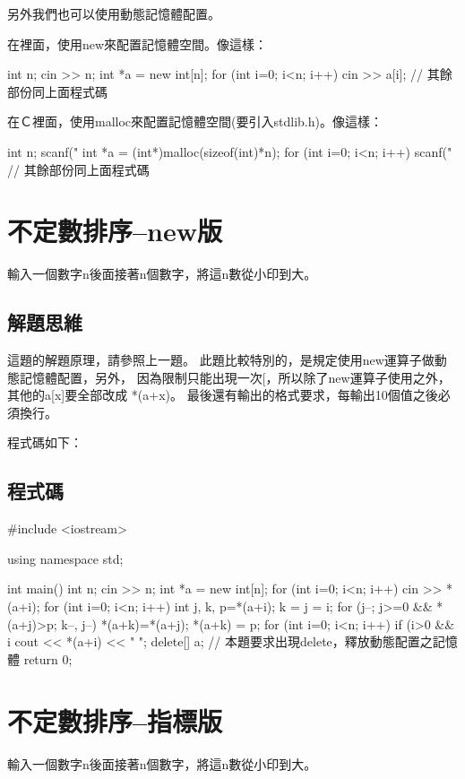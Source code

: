 另外我們也可以使用動態記憶體配置。

在\cc{}裡面，使用new來配置記憶體空間。像這樣：
\begin{inside}
	int n;  cin >> n;
	int *a = new int[n];
	for (int i=0; i<n; i++) cin >> a[i];
	// 其餘部份同上面程式碼
\end{inside}

在Ｃ裡面，使用malloc來配置記憶體空間(要引入stdlib.h)。像這樣：
\begin{inside}
	int n;  scanf("%
	int *a = (int*)malloc(sizeof(int)*n);
	for (int i=0; i<n; i++) scanf("%
	// 其餘部份同上面程式碼
\end{inside}


\section{不定數排序--new版}
輸入一個數字n後面接著n個數字，將這n數從小印到大。

\subsection{解題思維}
這題的解題原理，請參照上一題。
此題比較特別的，是規定使用new運算子做動態記憶體配置，另外，
因為限制只能出現一次[，所以除了new運算子使用之外，
其他的a[x]要全部改成 *(a+x)。
最後還有輸出的格式要求，每輸出10個值之後必須換行。

\vspace{0.5cm}
\noindent 程式碼如下：
\subsection{程式碼}
\begin{cppcode}
	#include <iostream>
	
	using namespace std;
	
	int main()
	{
		int n; cin >> n;
		int *a = new int[n];
		for (int i=0; i<n; i++) cin >> *(a+i);
		for (int i=0; i<n; i++) {
			int j, k, p=*(a+i);
			k = j = i;
			for (j--; j>=0 && *(a+j)>p; k--, j--) *(a+k)=*(a+j);
			*(a+k) = p;
		}
		for (int i=0; i<n; i++) {
			if (i>0 && i%
			cout << *(a+i) << " ";
		}
		delete[] a; // 本題要求出現delete，釋放動態配置之記憶體
		return 0;
	}
\end{cppcode}


\section{不定數排序--指標版}
輸入一個數字n後面接著n個數字，將這n數從小印到大。

